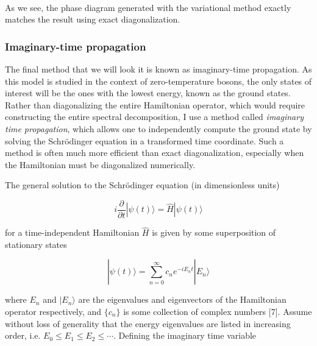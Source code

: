 \documentclass[11pt]{article}
\begin{document}
    \begin{center}
    \end{center}
    { \hspace*{\fill} \\}
    
    As we see, the phase diagram generated with the variational method
exactly matches the result using exact diagonalization.

    \hypertarget{imaginary-time-propagation}{%
\subsubsection{Imaginary-time
propagation}\label{imaginary-time-propagation}}

    The final method that we will look it is known as imaginary-time
propagation. As this model is studied in the context of zero-temperature
bosons, the only states of interest will be the ones with the lowest
energy, known as the ground states. Rather than diagonalizing the entire
Hamiltonian operator, which would require constructing the entire
spectral decomposition, I use a method called \emph{imaginary time
propagation}, which allows one to independently compute the ground state
by solving the Schrödinger equation in a transformed time coordinate.
Such a method is often much more efficient than exact diagonalization,
especially when the Hamiltonian must be diagonalized numerically.

The general solution to the Schrödinger equation (in dimensionless
units)

\begin{equation*}
i \frac{\partial}{\partial t} | \psi(t) \rangle = \hat H | \psi(t) \rangle
\end{equation*}

for a time-independent Hamiltonian \(\hat H\) is given by some
superposition of stationary states

\begin{equation} \label{eqn:Eexpand}
| \psi(t) \rangle = \sum_{n=0}^\infty c_n e^{-i E_n t} | E_n \rangle
\end{equation}

where \(E_n\) and \(| E_n \rangle\) are the eigenvalues and eigenvectors
of the Hamiltonian operator respectively, and \(\{ c_n \}\) is some
collection of complex numbers {[}7{]}. Assume without loss of generality
that the energy eigenvalues are listed in increasing order, i.e.
\(E_0 \leq E_1 \leq E_2 \leq \cdots\). Defining the imaginary time
variable
\end{document}
